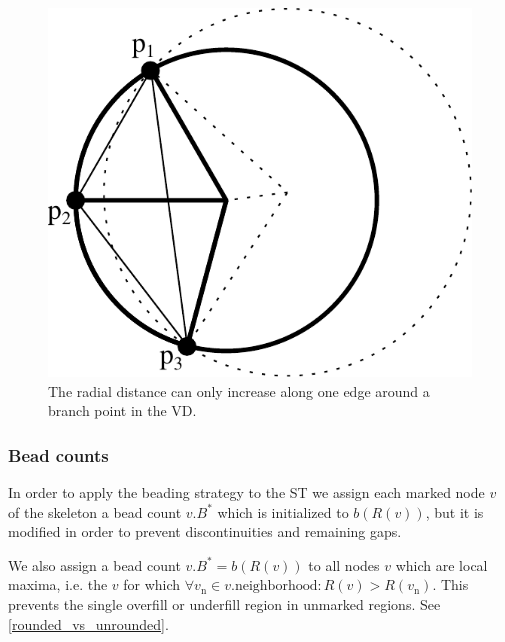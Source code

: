 \begin{figure}
\centering
\includegraphics[width=.4\columnwidth]{sources/method/branch_upward_edge_property.pdf}
\caption{The radial distance can only increase along one edge around a branch point in the VD.}
\label{branch_upward_edge_property}
\end{figure}

\subsubsection{Bead counts}
In order to apply the beading strategy to the ST
we assign each marked node $v$ of the skeleton a bead count $v.B^*$ which is initialized to $b(R(v))$, but it is modified in order to prevent discontinuities and remaining gaps.

We also assign a bead count $v.B^*=b(R(v))$ to all nodes $v$ which are local maxima, i.e. the $v$ for which $\forall v_\text{n} \in v.\text{neighborhood} : R(v) > R(v_\text{n})$. 
This prevents the single overfill or underfill region in unmarked regions.
See \cref{rounded_vs_unrounded}.




